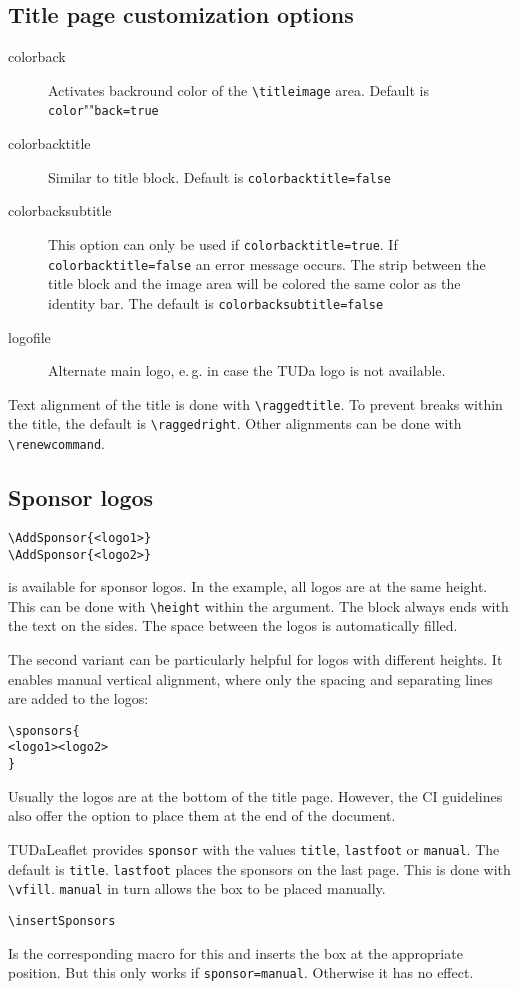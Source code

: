 \documentclass[
	english,%
	accentcolor=9c,%
]{tudaleaflet}
\begin{document}
\subsection{Title page customization options}
\begin{description}
	\item[colorback] Activates backround color of the \verb+\titleimage+ area. Default is \verb+color+""\verb+back=true+
	\item[colorbacktitle] Similar to title block. Default is \verb+colorbacktitle=false+
	\item[colorbacksubtitle] This option can only be used if \verb+colorbacktitle=true+. If \verb+colorbacktitle=false+ an error message occurs. The strip between the title block and the image area will be colored the same color as the identity bar. The default is \verb+colorbacksubtitle=false+
	\item[logofile] Alternate main logo, e.\,g. in case the TUDa logo is not available.
\end{description}

Text alignment of the title is done with \verb+\raggedtitle+.
To prevent breaks within the title, the default is \verb+\raggedright+.
Other alignments can be done with \verb+\renewcommand+.

\subsection{Sponsor logos}
\begin{verbatim}
\AddSponsor{<logo1>}
\AddSponsor{<logo2>}
\end{verbatim}
is available for sponsor logos.
In the example, all logos are at the same height. This can be done with \verb+\height+ within the argument.
The block always ends with the text on the sides. The space between the logos is automatically filled.

The second variant can be particularly helpful for logos with different heights.
It enables manual vertical alignment, where only the spacing and separating lines are added to the logos:

\begin{verbatim}
\sponsors{
<logo1><logo2>
}
\end{verbatim}

Usually the logos are at the bottom of the title page. However, the CI guidelines also offer the option to place them at the end of the document.

TUDaLeaflet provides \verb+sponsor+ with the values \verb+title+, \verb+lastfoot+ or \verb+manual+.
The default is \verb+title+.
\verb+lastfoot+ places the sponsors on the last page. This is done with \verb+\vfill+.
\verb+manual+ in turn allows the box to be placed manually.

\begin{verbatim}
\insertSponsors
\end{verbatim}
Is the corresponding macro for this and inserts the box at the appropriate position.
But this only works if \verb+sponsor=manual+.
Otherwise it has no effect.


\printbibliography
\end{document}
